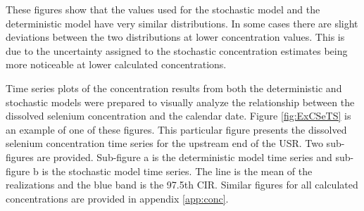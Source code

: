\begin{linenumbers}
These figures show that the values used for the stochastic model and the deterministic model have very similar distributions.  In some cases there are slight deviations between the two distributions at lower concentration values.  This is due to the uncertainty assigned to the stochastic concentration estimates being more noticeable at lower calculated concentrations.

Time series plots of the concentration results from both the deterministic and stochastic models were prepared to visually analyze the relationship between the dissolved selenium concentration and the calendar date.  Figure \ref{fig:ExCSeTS} is an example of one of these figures.  This particular figure presents the dissolved selenium concentration time series for the upstream end of the USR.  Two sub-figures are provided.  Sub-figure a is the deterministic model time series and sub-figure b is the stochastic model time series.  The line is the mean of the realizations and the blue band is the 97.5th CIR.  Similar figures for all calculated concentrations are provided in appendix \ref{app:conc}.


\end{linenumbers}
